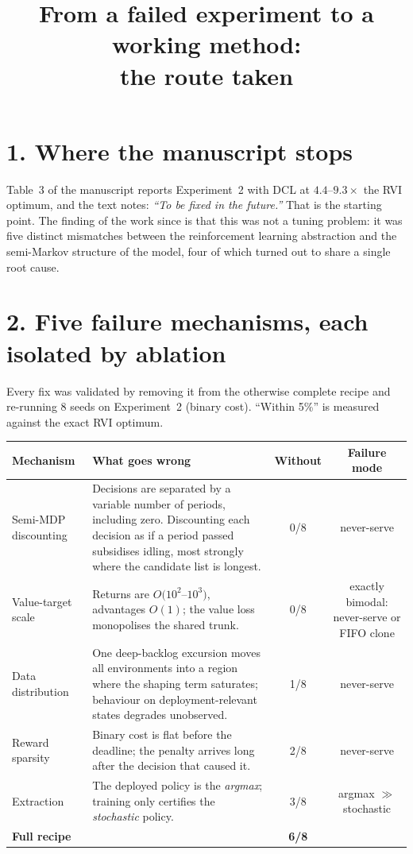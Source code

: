\documentclass[11pt,a4paper]{article}
\title{From a failed experiment to a working method:\\the route taken}
\author{}
\date{}
\begin{document}
\maketitle
\vspace{-1.5em}

\section*{1. Where the manuscript stops}

Table~3 of the manuscript reports Experiment~2 with DCL at $4.4$--$9.3\times$
the RVI optimum, and the text notes: \emph{``To be fixed in the future.''}
That is the starting point.  The finding of the work since is that this was not
a tuning problem: it was five distinct mismatches between the reinforcement
learning abstraction and the semi-Markov structure of the model, four of which
turned out to share a single root cause.

\section*{2. Five failure mechanisms, each isolated by ablation}

Every fix was validated by removing it from the otherwise complete recipe and
re-running 8 seeds on Experiment~2 (binary cost).  ``Within 5\%'' is measured
against the exact RVI optimum.

\begin{center}
\begin{tabular}{p{4.0cm}p{6.6cm}cc}
\toprule
\textbf{Mechanism} & \textbf{What goes wrong} & \textbf{Without} & \textbf{Failure mode} \\
\midrule
Semi-MDP discounting & Decisions are separated by a variable number of periods,
including zero.  Discounting each decision as if a period passed subsidises
idling, most strongly where the candidate list is longest. & 0/8 & never-serve \\[2pt]
Value-target scale & Returns are $O(10^2$--$10^3)$, advantages $O(1)$; the value
loss monopolises the shared trunk. & 0/8 & exactly bimodal:
never-serve or FIFO clone \\[2pt]
Data distribution & One deep-backlog excursion moves all environments into a
region where the shaping term saturates; behaviour on deployment-relevant
states degrades unobserved. & 1/8 & never-serve \\[2pt]
Reward sparsity & Binary cost is flat before the deadline; the penalty arrives
long after the decision that caused it. & 2/8 & never-serve \\[2pt]
Extraction & The deployed policy is the \emph{argmax}; training only certifies
the \emph{stochastic} policy. & 3/8 & argmax $\gg$ stochastic \\
\midrule
\textbf{Full recipe} & & \textbf{6/8} & \\
\bottomrule
\end{tabular}
\end{center}
\end{document}
